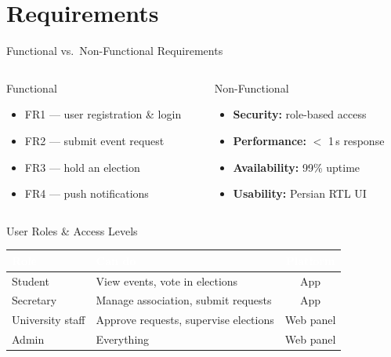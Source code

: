 \documentclass[
	11pt,              %
	aspectratio=169,   %
]{beamer}
\begin{document}
\section{Requirements}

\begin{frame}{Functional vs.\ Non-Functional Requirements}
	\begin{columns}[T] %
		\begin{column}{0.48\textwidth}
			\begin{block}{Functional}
				\begin{itemize}
					\item FR1 --- user registration \& login
					\item FR2 --- submit event request
					\item FR3 --- hold an election
					\item FR4 --- push notifications
				\end{itemize}
			\end{block}
		\end{column}
		\begin{column}{0.48\textwidth}
			\begin{block}{Non-Functional}
				\begin{itemize}
					\item \textbf{Security:} role-based access
					\item \textbf{Performance:} $<$ 1\,s response
					\item \textbf{Availability:} 99\% uptime
					\item \textbf{Usability:} Persian RTL UI
				\end{itemize}
			\end{block}
		\end{column}
	\end{columns}
\end{frame}

\begin{frame}{User Roles \& Access Levels}
	\begin{tabularx}{\linewidth}{l L c}
		\toprule
		\textcolor{white}{\textbf{Role}} &
		\textcolor{white}{\textbf{Can do}} &
		\textcolor{white}{\textbf{Platform}} \\
		\midrule
		Student         & View events, vote in elections        & App \\
		Secretary       & Manage association, submit requests   & App \\
		University staff& Approve requests, supervise elections & Web panel \\
		Admin           & Everything                            & Web panel \\
		\bottomrule
	\end{tabularx}
\end{frame}
\end{document}
